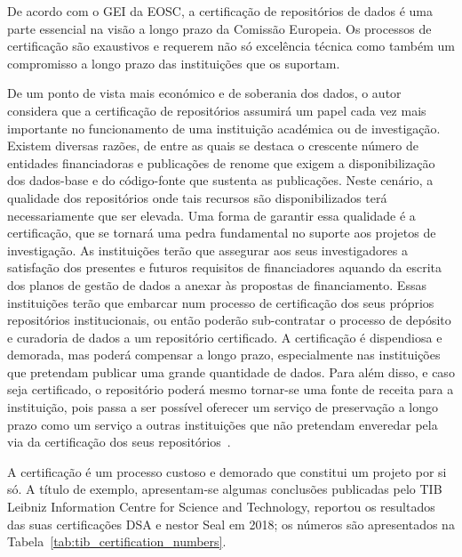 \documentclass[sigconf,nonacm]{acmart}
\begin{document}
De acordo com o \gls{GEI} da \gls{EOSC}, a certificação de repositórios de dados é uma parte essencial na visão a longo prazo da Comissão Europeia. Os processos de certificação são exaustivos e requerem não só excelência técnica como também um compromisso a longo prazo das instituições que os suportam.

De um ponto de vista mais económico e de soberania dos dados, o autor considera que a certificação de repositórios assumirá um papel cada vez mais importante no funcionamento de uma instituição académica ou de investigação. 
%
Existem diversas razões, de entre as quais se destaca o crescente número de entidades financiadoras e publicações de renome que exigem a disponibilização dos dados-base e do código-fonte que sustenta as publicações. 
%
Neste cenário, a qualidade dos repositórios onde tais recursos são disponibilizados terá necessariamente que ser elevada. Uma forma de garantir essa qualidade é a certificação, que se tornará uma pedra fundamental no suporte aos projetos de investigação. As instituições terão que assegurar aos seus investigadores a satisfação dos presentes e futuros requisitos de financiadores aquando da escrita dos planos de gestão de dados a anexar às propostas de financiamento. 
%
Essas instituições terão que embarcar num processo de certificação dos seus próprios repositórios institucionais, ou então poderão sub-contratar o processo de depósito e curadoria de dados a um repositório certificado. A certificação é dispendiosa e demorada, mas poderá compensar a longo prazo, especialmente nas instituições que pretendam publicar uma grande quantidade de dados. Para além disso, e caso seja certificado, o repositório poderá mesmo tornar-se uma fonte de receita para a instituição, pois passa a ser possível oferecer um serviço de preservação a longo prazo como um serviço a outras instituições que não pretendam enveredar pela via da certificação dos seus repositórios~\cite{Lindlar_Schwab_2019}.

A certificação é um processo custoso e demorado que constitui um projeto por si só. A título de exemplo, apresentam-se algumas conclusões publicadas pelo TIB Leibniz Information Centre for Science and Technology, reportou os resultados das suas certificações \gls{DSA} e \gls{nestor} Seal em 2018; os números são apresentados na Tabela~\ref{tab:tib_certification_numbers}.
\end{document}
